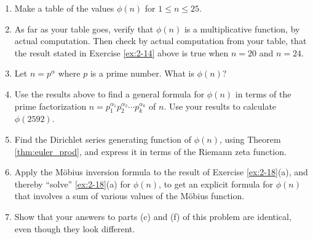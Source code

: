 \begin{exercise}
    \begin{enumerate}[label=(\alph*)]
        \item Make a table of the values $\phi(n)$ for $1\leq n\leq 25$.
        \item As far as your table goes, verify that $\phi(n)$ is a multiplicative function, by actual computation. Then check by actual computation from your table, that the result stated in Exercise \ref{ex:2-14} above is true when $n=20$ and $n=24$.
        \item Let $n=p^\alpha$ where $p$ is a prime number. What is $\phi(n)$?
        \item Use the results above to find a general formula for $\phi(n)$ in terms of the prime factorization $n=p_1^{\alpha_1}p_2^{\alpha_2}\cdots p_k^{\alpha_k}$ of $n$. Use your results to calculate $\phi(2592)$.
        \item Find the Dirichlet series generating function of $\phi(n)$, using Theorem \ref{thm:euler_prod}, and express it in terms of the Riemann zeta function.
        \item Apply the M{\"o}bius inversion formula to the result of Exercise \ref{ex:2-18}(a), and thereby ``solve'' \ref{ex:2-18}(a) for $\phi(n)$, to get an explicit formula for $\phi(n)$ that involves a sum of various values of the M{\"o}bius function.
        \item Show that your answers to parts (c) and (f) of this problem are identical, even though they look different.
    \end{enumerate}
\end{exercise}
